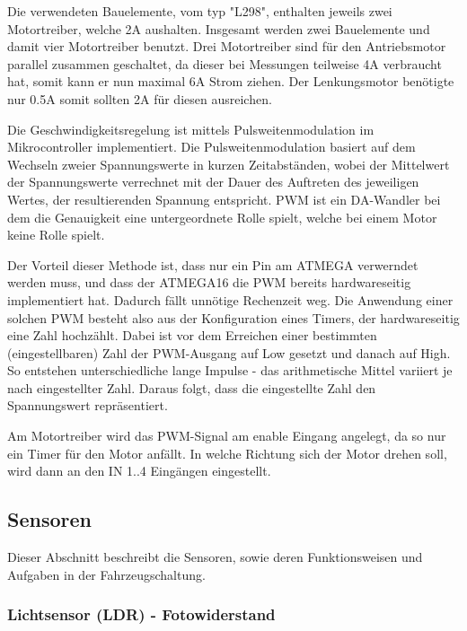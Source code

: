 \documentclass{scrartcl}
\begin{document}

		Die verwendeten Bauelemente, vom typ "L298", enthalten jeweils zwei Motortreiber, welche 2A aushalten.
		Insgesamt werden zwei Bauelemente und damit vier Motortreiber benutzt.
		Drei Motortreiber sind für den Antriebsmotor parallel zusammen geschaltet, da dieser 
		bei Messungen teilweise 4A verbraucht hat, somit kann er nun maximal 6A Strom ziehen.
		Der Lenkungsmotor benötigte nur 0.5A somit sollten 2A für diesen ausreichen.
				

		Die Geschwindigkeitsregelung ist mittels Pulsweitenmodulation im Mikrocontroller implementiert.
		Die Pulsweitenmodulation basiert auf dem Wechseln zweier Spannungswerte in kurzen Zeitabständen, wobei
		der Mittelwert der Spannungswerte verrechnet mit der Dauer des Auftreten des jeweiligen Wertes,
		der resultierenden Spannung entspricht.
		PWM ist ein DA-Wandler bei dem die Genauigkeit eine untergeordnete Rolle spielt, welche bei
		einem Motor keine Rolle spielt.

		Der Vorteil dieser Methode ist, dass nur ein Pin am ATMEGA verwerndet werden muss, und dass der ATMEGA16 die PWM
		bereits hardwareseitig implementiert hat. Dadurch fällt unnötige Rechenzeit weg.
		Die Anwendung einer solchen PWM besteht also aus der Konfiguration eines Timers,
		der hardwareseitig eine Zahl hochzählt. Dabei ist vor dem Erreichen einer bestimmten
		(eingestellbaren) Zahl der PWM-Ausgang auf Low gesetzt und danach auf High.
		So entstehen unterschiedliche lange Impulse - das arithmetische Mittel variiert je nach eingestellter Zahl.
		Daraus folgt, dass die eingestellte Zahl den Spannungswert repräsentiert.

		Am Motortreiber wird das PWM-Signal am enable Eingang angelegt, da so nur ein Timer für den Motor anfällt.
		In welche Richtung sich der Motor drehen soll, wird dann an den IN 1..4 Eingängen eingestellt.
		
	
	\subsection{Sensoren}
		Dieser Abschnitt beschreibt die Sensoren, sowie deren Funktionsweisen und Aufgaben
		in der Fahrzeugschaltung.


		\subsubsection{Lichtsensor (LDR) - Fotowiderstand}
\end{document}
